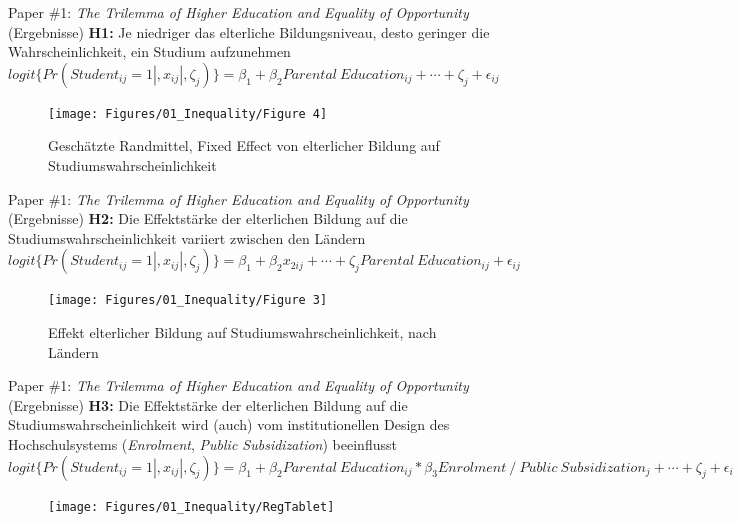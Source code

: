 \documentclass[
  ignorenonframetext,
]{beamer}
\begin{document}
\begin{frame}{Paper \#1: \emph{The Trilemma of Higher Education and
Equality of Opportunity} (Ergebnisse)}
\protect\hypertarget{paper-1-the-trilemma-of-higher-education-and-equality-of-opportunity-ergebnisse}{}
\textbf{H1:} Je niedriger das elterliche Bildungsniveau, desto geringer
die Wahrscheinlichkeit, ein Studium aufzunehmen \scriptsize 
\(logit\{Pr(Student_{ij} = 1|,x_{ij}|,\zeta_{j})\} = \beta_{1} + \beta_{2}Parental\:Education_{ij} + \cdots + \zeta_{j} + \epsilon_{ij}\)

\begin{figure}
\texttt{[image: Figures/01\_Inequality/Figure 4]} \caption{Geschätzte Randmittel, Fixed Effect von elterlicher Bildung auf Studiumswahrscheinlichkeit}\label{fig:unnamed-chunk-4}
\end{figure}
\end{frame}

\begin{frame}{Paper \#1: \emph{The Trilemma of Higher Education and
Equality of Opportunity} (Ergebnisse)}
\protect\hypertarget{paper-1-the-trilemma-of-higher-education-and-equality-of-opportunity-ergebnisse-1}{}
\textbf{H2:} Die Effektstärke der elterlichen Bildung auf die
Studiumswahrscheinlichkeit variiert zwischen den Ländern \scriptsize 
\(logit\{Pr(Student_{ij} = 1|,x_{ij}|,\zeta_{j})\} = \beta_{1} + \beta_{2}x_{2ij} + \cdots + \zeta_{j}Parental\:Education_{ij} + \epsilon_{ij}\)

\begin{figure}
\texttt{[image: Figures/01\_Inequality/Figure 3]} \caption{Effekt elterlicher Bildung auf Studiumswahrscheinlichkeit, nach Ländern}\label{fig:unnamed-chunk-5}
\end{figure}
\end{frame}

\begin{frame}{Paper \#1: \emph{The Trilemma of Higher Education and
Equality of Opportunity} (Ergebnisse)}
\protect\hypertarget{paper-1-the-trilemma-of-higher-education-and-equality-of-opportunity-ergebnisse-2}{}
\textbf{H3:} Die Effektstärke der elterlichen Bildung auf die
Studiumswahrscheinlichkeit wird (auch) vom institutionellen Design des
Hochschulsystems (\emph{Enrolment}, \emph{Public Subsidization})
beeinflusst \scriptsize 
\(logit\{Pr(Student_{ij} = 1|,x_{ij}|,\zeta_{j})\} = \beta_{1} + \beta_{2}Parental\:Education_{ij} *\beta_{3}Enrolment\: /\: Public\:Subsidization_{j} + \cdots + \zeta_{j} + \epsilon_{i}\)

\begin{figure}
\texttt{[image: Figures/01\_Inequality/RegTablet]} \end{figure}
\end{frame}
\end{document}
